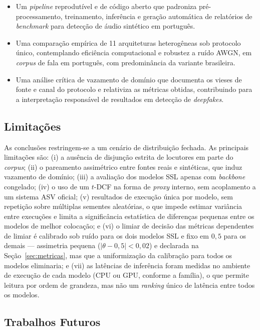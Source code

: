 \documentclass[12pt,a4paper]{article}
\begin{document}
\begin{itemize}
    \item Um \textit{pipeline} reprodutível e de código aberto que padroniza
    pré-processamento, treinamento, inferência e geração automática de
    relatórios de \textit{benchmark} para detecção de áudio sintético em
    português.
    \item Uma comparação empírica de \num{11} arquiteturas heterogêneas sob
    protocolo único, contemplando eficiência computacional e robustez a ruído
    AWGN, em \textit{corpus} de fala em português, com predominância da
    variante brasileira.
    \item Uma análise crítica de vazamento de domínio que documenta os vieses de
    fonte e canal do protocolo e relativiza as métricas obtidas, contribuindo
    para a interpretação responsável de resultados em detecção de
    \textit{deepfakes}.
\end{itemize}

\subsection{Limitações}
\label{sec:limitacoes}

As conclusões restringem-se a um cenário de distribuição fechada. As principais
limitações são: (i) a ausência de disjunção estrita de locutores em parte do
\textit{corpus}; (ii) o pareamento assimétrico entre fontes reais e sintéticas,
que induz vazamento de domínio; (iii) a avaliação dos modelos SSL apenas com
\textit{backbone} congelado; (iv) o uso de um $t$-DCF na forma de \textit{proxy}
interno, sem acoplamento a um sistema ASV oficial; (v) resultados de execução
única por modelo, sem repetição sobre múltiplas sementes aleatórias, o que
impede estimar variância entre execuções e limita a significância estatística
de diferenças pequenas entre os modelos de melhor colocação; e (vi) o limiar
de decisão das métricas dependentes de limiar é calibrado sob ruído para os
dois modelos SSL e fixo em $0{,}5$ para os demais --- assimetria pequena
($|\theta - 0{,}5| < 0{,}02$) e declarada na Seção~\ref{sec:metricas}, mas que
a uniformização da calibração para todos os modelos eliminaria; e (vii) as
latências de inferência foram medidas no ambiente de execução de cada modelo
(CPU ou GPU, conforme a família), o que permite leitura por ordem de grandeza,
mas não um \textit{ranking} único de latência entre todos os modelos.

\subsection{Trabalhos Futuros}
\label{sec:trabalhos_futuros}
\end{document}

